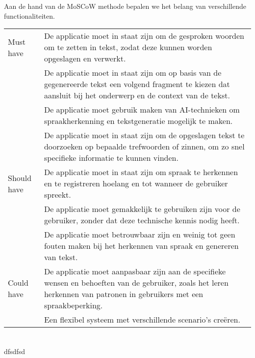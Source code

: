 Aan de hand van de MoSCoW methode bepalen we het belang van verschillende functionaliteiten.
\begin{center}
    \begin{tabular}{ |p{2.5cm}|p{12cm}| }
        \hline
       Must have & De applicatie moet in staat zijn om de gesproken woorden om te zetten in tekst, zodat deze kunnen worden opgeslagen en verwerkt. \\
       \cline{2-2}
        & De applicatie moet in staat zijn om op basis van de gegenereerde tekst een volgend fragment te kiezen dat aansluit bij het onderwerp en de context van de tekst. \\
        \cline{2-2}
        & De applicatie moet gebruik maken van AI-technieken om spraakherkenning en tekstgeneratie mogelijk te maken. \\
        \cline{2-2}
        & De applicatie moet in staat zijn om de opgeslagen tekst te doorzoeken op bepaalde trefwoorden of zinnen, om zo snel specifieke informatie te kunnen vinden. \\
        \hline
        Should have & De applicatie moet in staat zijn om spraak te herkennen en te registreren hoelang en tot wanneer de gebruiker spreekt. \\
        \cline{2-2}
        & De applicatie moet gemakkelijk te gebruiken zijn voor de gebruiker, zonder dat deze technische kennis nodig heeft. \\
        \cline{2-2}
        & De applicatie moet betrouwbaar zijn en weinig tot geen fouten maken bij het herkennen van spraak en genereren van tekst. \\
        \hline
        Could have & De applicatie moet aanpasbaar zijn aan de specifieke wensen en behoeften van de gebruiker, zoals het leren herkennen van patronen in gebruikers met een spraakbeperking. \\
        \cline{2-2}
        & Een flexibel systeem met verschillende scenario’s creëren. \\
        \hline
    \end{tabular}
\end{center}

\subsection{}%




\section{} \label{sect:Proof-of-concept}%

dfsdfsd